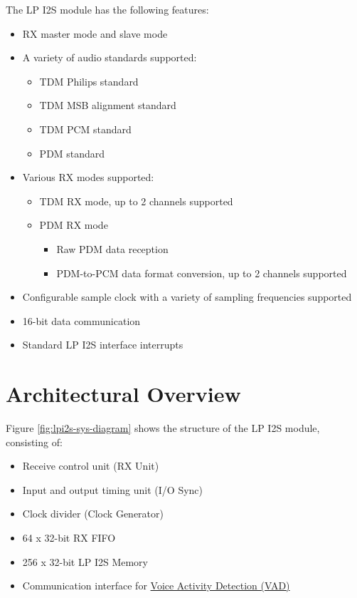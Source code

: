 \documentclass[main\_\_EN.tex]{subfiles}
\begin{document}
The LP I2S module has the following features:

\begin{itemize}
    \item RX master mode and slave mode
    \item A variety of audio standards supported: 
        \begin{itemize}
            \item TDM Philips standard
            \item TDM MSB alignment standard
            \item TDM PCM standard
            \item PDM standard
        \end{itemize}
    \item Various RX modes supported:
        \begin{itemize}
        \item TDM RX mode, up to 2 channels supported
        \item PDM RX mode
            \begin{itemize}
                \item Raw PDM data reception
                \item PDM-to-PCM data format conversion, up to 2 channels supported
            \end{itemize}
        \end{itemize}
    \item Configurable sample clock with a variety of sampling frequencies supported
    \item 16-bit data communication
    \item Standard LP I2S interface interrupts 
\end{itemize}



\section{Architectural Overview}
\label{sec:lpi2s-arch-overview}

Figure \ref{fig:lpi2s-sys-diagram} shows the structure of the \chipname{} LP I2S module, consisting of:
    
\begin{itemize}
    \item Receive control unit (RX Unit)
    \item Input and output timing unit (I/O Sync)
    \item Clock divider (Clock Generator)
    \item 64 x 32-bit RX FIFO
    \item 256 x 32-bit LP I2S Memory
    \item Communication interface for \hyperref[mod:vad]{Voice Activity Detection (VAD)}
\end{itemize}
\end{document}
